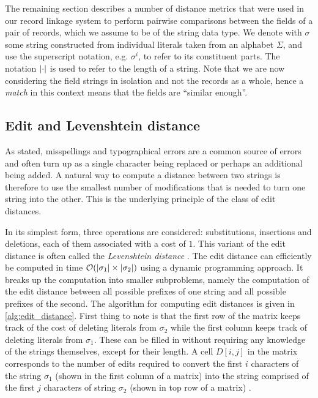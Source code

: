 The remaining section describes a number of distance metrics that were used in our record linkage system to perform pairwise comparisons between the fields of a pair of records, which we assume to be of the string data type.
We denote with $\sigma$ some string constructed from individual literals taken from an alphabet $\Sigma$, and use the superscript notation, e.g. $\sigma^{i}$, to refer to its constituent parts.
The notation $\lvert\cdot\rvert$ is used to refer to the length of a string.
Note that we are now considering the field strings in isolation and not the records as a whole, hence a \emph{match} in this context means that the fields are ``similar enough''.




\subsection{Edit and Levenshtein distance}
\label{sec:edit_distance}

As stated, misspellings and typographical errors are a common source of errors and often turn up as a single character being replaced or perhaps an additional being added.
A natural way to compute a distance between two strings is therefore to use the smallest number of modifications that is needed to turn one string into the other.
This is the underlying principle of the class of edit distances.

In its simplest form, three operations are considered: substitutions, insertions and deletions, each of them associated with a cost of $1$.
This variant of the edit distance is often called the \emph{Levenshtein distance} \citep{Levenshtein1966}.
The edit distance can efficiently be computed in time $\mathcal{O}(\lvert\sigma_1\rvert \times \lvert\sigma_2\rvert)$ using a dynamic programming approach.
It breaks up the computation into smaller subproblems, namely the computation of the edit distance between all possible prefixes of one string and all possible prefixes of the second.
The algorithm for computing edit distances is given in \cref{alg:edit_distance}.
First thing to note is that the first row of the matrix keeps track of the cost of deleting literals from $\sigma_{2}$ while the first column keeps track of deleting literals from $\sigma_{1}$.
These can be filled in without requiring any knowledge of the strings themselves, except for their length.
A cell $D[i,j]$ in the matrix corresponds to the number of edits required to convert the first $i$ characters of the string $\sigma_1$ (shown in the first column of a matrix) into the string comprised of the first $j$ characters of string $\sigma_2$ (shown in top row of a matrix) \citep{Christen2012}.

